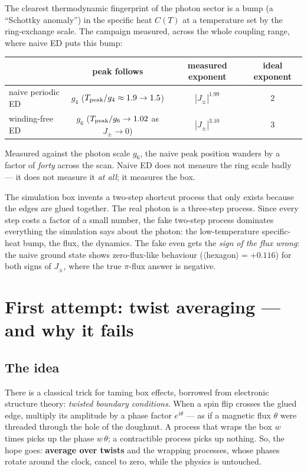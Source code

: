 \documentclass[11pt,a4paper]{article}
\newcommand{\Jpm}{J_{\pm}}
\newcommand{\gfour}{g_4}
\newcommand{\gsix}{g_6}
\begin{document}
The clearest thermodynamic fingerprint of the photon sector is a bump (a
``Schottky anomaly'') in the specific heat $C(T)$ at a temperature set by the
ring-exchange scale.  The campaign measured, across the whole coupling range,
where naive ED puts this bump:

\begin{center}
\begin{tabular}{lccc}
\toprule
 & peak follows & measured exponent & ideal exponent\\
\midrule
naive periodic ED & $\gfour$ \; ($T_{\rm peak}/\gfour \approx 1.9\to1.5$) & $|\Jpm|^{1.99}$ & 2 \\
winding-free ED & $\gsix$ \; ($T_{\rm peak}/\gsix \to 1.02$ as $\Jpm\to0$) & $|\Jpm|^{3.10}$ & 3 \\
\bottomrule
\end{tabular}
\end{center}

Measured against the photon scale $\gsix$, the naive peak position wanders by
a factor of \emph{forty} across the scan.  Naive ED does not measure the ring
scale badly --- it does not measure it \emph{at all}; it measures the box.

\begin{plainwords}
The simulation box invents a two-step shortcut process that only exists
because the edges are glued together.  The real photon is a three-step
process.  Since every step costs a factor of a small number, the fake
two-step process dominates everything the simulation says about the photon:
the low-temperature specific-heat bump, the flux, the dynamics.  The fake even
gets the \emph{sign of the flux wrong}: the naive ground state shows
zero-flux-like behaviour ($\langle$hexagon$\rangle = +0.116$) for both signs of
$\Jpm$, where the true $\pi$-flux answer is negative.
\end{plainwords}

\section{First attempt: twist averaging --- and why it fails}
\label{sec:twist}

\subsection{The idea}

There is a classical trick for taming box effects, borrowed from electronic
structure theory: \emph{twisted boundary conditions}.  When a spin flip
crosses the glued edge, multiply its amplitude by a phase factor
$e^{i\theta}$ --- as if a magnetic flux $\theta$ were threaded through the
hole of the doughnut.  A process that wraps the box $w$ times picks up the
phase $w\,\theta$; a contractible process picks up nothing.  So, the hope
goes: \textbf{average over twists} and the wrapping processes, whose phases
rotate around the clock, cancel to zero, while the physics is untouched.
\end{document}
